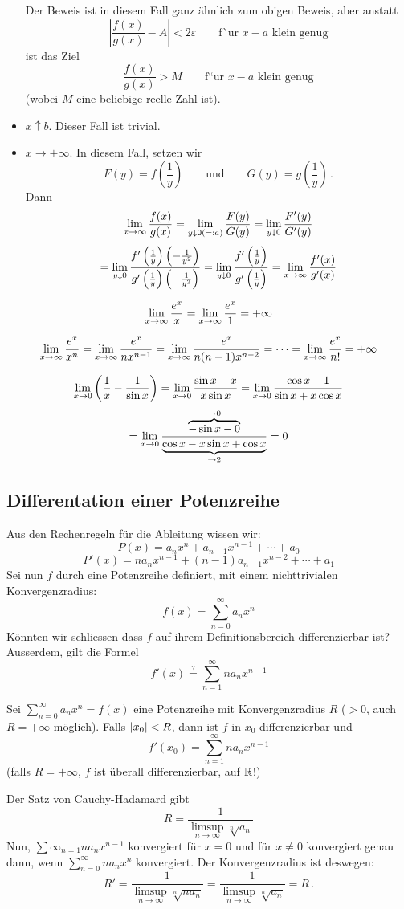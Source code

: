 \begin{Bew}
\begin{itemize}
Der Beweis ist in diesem Fall ganz \"ahnlich zum obigen Beweis, aber anstatt
\[\left|\frac{f(x)}{g(x)}-A\right|<2\varepsilon \qquad \mbox{f\``ur $x-a$ klein genug}\]
ist das Ziel
\[\frac{f(x)}{g(x)} > M \qquad \mbox{f``ur $x-a$ klein genug}\]
(wobei $M$ eine beliebige reelle Zahl ist).
    \item $x\uparrow b$. Dieser Fall ist trivial.
\item $x\to +\infty$. In diesem Fall, setzen wir
  \[F(y)=f\left( \frac{1}{y} \right) \qquad \mbox{und}\qquad 
G(y)=g\left( \frac{1}{y} \right)\, .\]
Dann
\[\displaystyle\lim_{x\rightarrow\infty}\frac{f(x)}{g(x)}=\lim_{y\downarrow 0 (=:a)}\frac{F(y)}{G(y)}
=\lim_{y\downarrow 0}\frac{F'(y)}{G'(y)}\]
\[=
\lim_{y\downarrow 0} \frac{f'\left(\frac{1}{y}\right)\left( -\frac{1}{y^2} \right)}
{g'\left( \frac{1}{y} \right)\left( -\frac{1}{y^2} \right)}
=\lim_{y\downarrow 0}\frac{f'\left(\frac{1}{y}\right)}{g'\left(
\frac{1}{y}\right)}=\displaystyle\lim_{x\rightarrow\infty}\frac{f'(x)}{g'(x)}\]
\end{itemize}
\end{Bew}
\begin{Bsp}
  \[\displaystyle\lim_{x\rightarrow\infty}\frac{e^x}{x}=\displaystyle\lim_{x\rightarrow\infty}\frac{e^x}{1}=+\infty\]
\end{Bsp}
\begin{Bsp}
  \[\displaystyle\lim_{x\rightarrow\infty}\frac{e^x}{x^n}=\displaystyle\lim_{x\rightarrow\infty}\frac{e^x}{nx^{n-1}}=\displaystyle\lim_{x\rightarrow\infty}\frac{e^x}{n(n-1)x^{n-2}}=\cdots=\displaystyle\lim_{x\rightarrow\infty}\frac{e^x}{n!}=+\infty\]
\end{Bsp}
\begin{Bsp}
  \[\displaystyle\lim_{x\rightarrow0}\left( \frac{1}{x}-\frac{1}{\sin x} \right)=\displaystyle\lim_{x\rightarrow0}\frac{\sin x-x}{x\sin x}=\displaystyle\lim_{x\rightarrow0}\frac{\cos x-1}{\sin x + x\cos x}\]
  \[=\displaystyle\lim_{x\rightarrow0}\frac{\overbrace{-\sin x-0}^{\to 0}}{\underbrace{\cos x-x\sin x + \cos x}_{\to 2}}=0\]
\end{Bsp}
\subsection{Differentation einer Potenzreihe}
Aus den Rechenregeln f\"ur die Ableitung wissen wir:
\[P(x)=a_nx^n+a_{n-1}x^{n-1}+\cdots+a_0\]
\[P'(x)=na_nx^{n-1}+(n-1)a_{n-1}x^{n-2}+\cdots+a_1\]
Sei nun $f$ durch eine Potenzreihe definiert, mit einem nichttrivialen Konvergenzradius:
\[f(x)=\sum^\infty_{n=0}a_nx^n\]
K\"onnten wir schliessen dass $f$ auf ihrem Definitionsbereich differenzierbar ist? 
Ausserdem, gilt die Formel
\[f'(x)\stackrel{?}{=}\sum_{n=1}^\infty na_nx^{n-1}\]
\begin{Sat}\label{s:diff}
  Sei $\sum^\infty_{n=0}a_nx^n=f(x)$ eine Potenzreihe mit Konvergenzradius $R$ 
($> 0$, auch $R=+\infty$ m\"oglich). Falls $\mathopen| x_0 \mathclose|<R$, dann ist $f$ in $x_0$ differenzierbar und
  \[f'(x_0)=\sum^\infty_{n=1}na_nx^{n-1}\]
  (falls $R=+\infty$, $f$ ist überall differenzierbar, auf $\mathbb{R}$!)
\end{Sat}
\begin{Bem}\label{b:R=R'} Der Satz von Cauchy-Hadamard gibt
  \[R=\frac{1}{\limsup_{n\to\infty}\sqrt[n]{a_n}}\]
Nun, $\sum\infty_{n=1}n a_n x^{n-1}$ konvergiert für $x=0$ und 
für $x\neq 0$ konvergiert genau dann, wenn $\sum^\infty_{n=0} na_nx^n$ konvergiert. 
Der Konvergenzradius ist deswegen:
  \[R'=\frac{1}{\limsup_{n\to\infty}\sqrt[n]{na_n}}
= \frac{1}{\limsup_{n\to\infty} \sqrt[n]{a_n}} =R\, .\]
\end{Bem}


